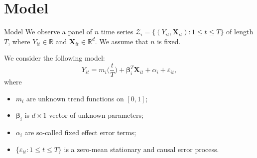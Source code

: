 \documentclass[10pt, handout]{beamer}
\newcommand{\eps}{\varepsilon}
\newcommand{\reals}{\mathbb{R}}
\newcommand{\X}{\boldsymbol{X}}
\newcommand{\bfbeta}{\boldsymbol{\beta}}
\begin{document}


\section{Model}

\begin{frame}{Model}
We observe a panel of $n$ time series $\mathcal{Z}_i = \{(Y_{it}, \X_{it}): 1 \le t \le T \}$ of length $T$, where $Y_{it} \in \reals$ and $\X_{it}\in \reals^{d}$. \pause We assume that $n$ is fixed. \pause

We consider the following model:
\begin{equation*}
Y_{it} = m_i \Big( \frac{t}{T} \Big) + \bfbeta_i^T\X_{it}+ \alpha_i + \varepsilon_{it},
\end{equation*}\pause
\vspace{-3mm}
where
\begin{itemize}
\item $m_i$ are unknown trend functions on $[0,1]$;\pause
\item $\bfbeta_i$ is $d\times 1$ vector of unknown parameters;\pause
\item $\alpha_i$ are so-called fixed effect error terms;\pause
\item $\{\eps_{it}: 1\leq t \leq T\}$ is a zero-mean stationary and causal error process.
\end{itemize}
\end{frame}
\end{document}
